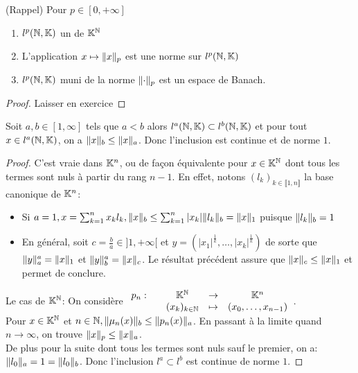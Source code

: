 \documentclass[]{report}
\begin{document}
    \begin{tm}{}{}
        (Rappel) Pour $p\in [0,+\infty]$
        \begin{enumerate}
            \item $l^p(\mathbb{N},\mathbb{K})$ un \sev de $\mathbb{K}^{\mathbb{N}}$
            \item L'application $x\mapsto \lVert x \rVert_p$ est une norme sur $l^p(\mathbb{N},\mathbb{K})$
            \item $l^p(\mathbb{N},\mathbb{K})$ muni de la norme $\lVert \cdot \rVert_p$ est un espace de Banach.
        \end{enumerate}
    \end{tm}

    \begin{proof}
        Laisser en exercice
    \end{proof}

    \begin{prop}{}{}
        Soit $a,b\in [1,\infty]$ tels que $a<b$ alors $l^a(\mathbb{N},\mathbb{K})\subset l^b(\mathbb{N},\mathbb{K})$ et pour tout $x\in l^a(\mathbb{N},\mathbb{K})$, on a $\lVert x \rVert_b\le \lVert x \rVert_a$. Donc l'inclusion est continue et de norme $1$.
    \end{prop}

    \begin{proof}
        C'est vraie dans $\mathbb{K}^n$, ou de façon équivalente pour $x\in \mathbb{K}^{\mathbb{N}}$ dont tous les termes sont nuls à partir du rang $n-1$. En effet, notons $(l_k)_{k\in \llbracket 1,n\rrbracket}$ la base canonique de $\mathbb{K}^n$:
        \begin{itemize}
            \item Si $a=1,x=\sum_{k=1}^{n}x_k l_k,\lVert x \rVert_b\le \sum_{k=1}^{n}|x_k|\lVert l_k \rVert_b=\lVert x \rVert_1$ puisque $\lVert l_k \rVert_b=1$
            \item En général, soit $c=\frac{b}{a}\in ]1,+\infty[$ et $y=(|x_1|^\frac{1}{k},\ldots,|x_k|^\frac{1}{k})$ de sorte que $\lVert y \rVert_a^a=\lVert x \rVert_1$ et $\lVert y \rVert_b^a=\lVert x \rVert_c$. Le résultat précédent assure que $\lVert x \rVert_c\le \lVert x \rVert_1$ et permet de conclure.
        \end{itemize}
        Le cas de $\mathbb{K}^{\mathbb{N}}$: On considère $\begin{array}{ccccc} p_n : & & \mathbb{K}^{\mathbb{N}} & \to & \mathbb{K}^n \\ & & (x_k)_{k\in \mathbb{N}} & \mapsto & (x_0,\ldots,x_{n-1}) \end{array}$.\\
        Pour $x\in \mathbb{K}^{\mathbb{N}}$ et ${n\in\mathbb{N}}, \lVert \mu_n(x) \rVert_b\le \lVert p_n(x) \rVert_a$. En passant à la limite quand $n\to \infty$, on trouve $\lVert x \rVert_p\le \lVert x \rVert_a$.\\
        De plus pour la suite dont tous les termes sont nuls sauf le premier, on a: $\lVert l_0 \rVert_a=1=\lVert l_0 \rVert_b$. Donc l'inclusion $l^a\subset l^b$ est continue de norme $1$.
    \end{proof}
\end{document}

